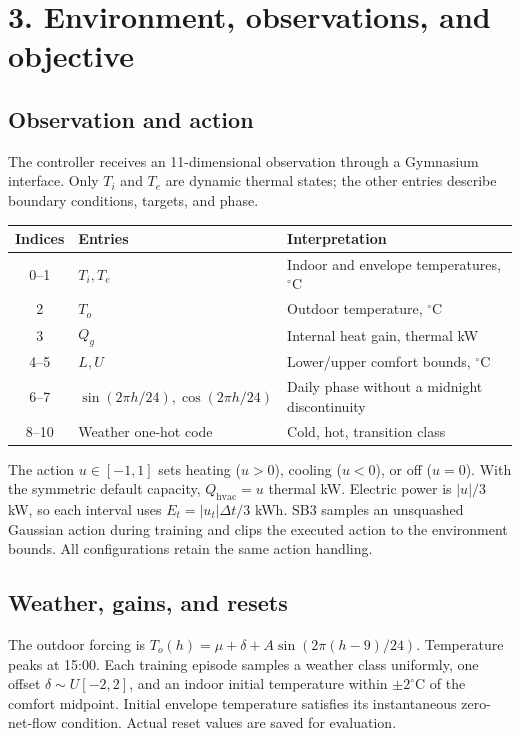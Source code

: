 \documentclass[10pt,a4paper]{article}
\begin{document}
\section*{3. Environment, observations, and objective}
\subsection*{Observation and action}
The controller receives an 11-dimensional observation through a Gymnasium interface. Only $T_i$ and $T_e$ are dynamic thermal states; the other entries describe boundary conditions, targets, and phase.

\begin{center}
\begin{tabular}{clp{88mm}}
\toprule Indices & Entries & Interpretation \\
\midrule
0--1 & $T_i,T_e$ & Indoor and envelope temperatures, $^\circ$C \\
2 & $T_o$ & Outdoor temperature, $^\circ$C \\
3 & $Q_g$ & Internal heat gain, thermal kW \\
4--5 & $L,U$ & Lower/upper comfort bounds, $^\circ$C \\
6--7 & $\sin(2\pi h/24),\cos(2\pi h/24)$ & Daily phase without a midnight discontinuity \\
8--10 & Weather one-hot code & Cold, hot, transition class \\
\bottomrule
\end{tabular}
\end{center}

The action $u\in[-1,1]$ sets heating ($u>0$), cooling ($u<0$), or off ($u=0$). With the symmetric default capacity, $Q_{\mathrm{hvac}}=u$ thermal kW. Electric power is $|u|/3$ kW, so each interval uses $E_t=|u_t|\Delta t/3$ kWh. SB3 samples an unsquashed Gaussian action during training and clips the executed action to the environment bounds. All configurations retain the same action handling.

\subsection*{Weather, gains, and resets}
The outdoor forcing is $T_o(h)=\mu+\delta+A\sin(2\pi(h-9)/24)$. Temperature peaks at 15:00. Each training episode samples a weather class uniformly, one offset $\delta\sim U[-2,2]$, and an indoor initial temperature within $\pm2^\circ$C of the comfort midpoint. Initial envelope temperature satisfies its instantaneous zero-net-flow condition. Actual reset values are saved for evaluation.
\end{document}
